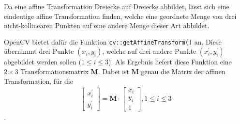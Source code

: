 \documentclass{whswinvcbook}
\begin{document}
Da eine affine Transformation Dreiecke auf Dreiecke abbildet, lässt sich eine eindeutige affine Transformation finden, welche eine geordnete Menge von drei nicht-kollinearen Punkten auf eine andere Menge dieser Art abbildet.

OpenCV bietet dafür die Funktion \texttt{cv::getAffineTransform()} an. Diese übernimmt drei Punkte $(x_i,y_i)$, welche auf drei andere Punkte $(x_i^\prime,y_i^\prime)$ abgebildet werden sollen ($1\leq i\leq3$). Als Ergebnis liefert diese Funktion eine $2\times3$ Transformationsmatrix $\mathbf{M}$. Dabei ist $\mathbf{M}$ genau die Matrix der affinen Transformation, für die 
\begin{align}
\begin{bmatrix}x_i^\prime\\y_i^\prime\end{bmatrix}=\mathbf{M}\cdot\begin{bmatrix}x_i\\y_i\\1\end{bmatrix},1\leq i\leq3 \label{eq1}
\end{align}.\cite{opencv6}
\end{document}
